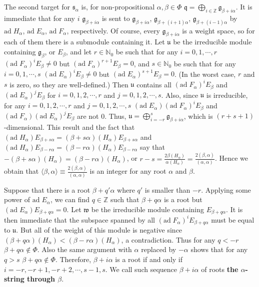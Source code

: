 \documentclass{article}
\newcommand{\NaN}{\mathbb{N}}
\newcommand{\InZ}{\mathbb{Z}}
\newcommand{\lie}[1]{\mathfrak{#1}}
\newcommand{\ad}[1]{\mathrm{ad}\; #1}
\begin{document}
The second target for $\lie{s}_\alpha$ is, for non-propositional $\alpha, \beta \in \Phi$ $\lie{q} = \bigoplus_{i \in \InZ} \lie{g}_{\beta + i\alpha}$.
It is immediate that for any $i$ $\lie{g}_{\beta + i\alpha}$ is sent to $\lie{g}_{\beta + i\alpha}$, $\lie{g}_{\beta + (i + 1)\alpha}$, $\lie{g}_{\beta + (i - 1)\alpha}$ by $\ad{H_\alpha}$, $\ad{E_\alpha}$, $\ad{F_\alpha}$, respectively.
Of course, every $\lie{g}_{\beta + i\alpha}$ is a weight space, so for each of them there is a submodule containing it.
Let $\lie{u}$ be the irreducible module containing $\lie{g}_\beta$, or $E_\beta$, and let $r \in \NaN_0$ be such that for any $i = 0, 1, \cdots, r$ $(\ad{F_\alpha})^i E_\beta \ne 0$ but $(\ad{F_\alpha})^{r + 1} E_\beta = 0$, and $s \in \NaN_0$ be such that for any $i = 0, 1, \cdots, s$ $(\ad{E_\alpha})^i E_\beta \ne 0$ but $(\ad{E_\alpha})^{s + 1} E_\beta = 0$.
(In the worst case, $r$ and $s$ is zero, so they are well-defined.)
Then $\lie{u}$ contains all $(\ad{F_\alpha})^i E_\beta$ and $(\ad{E_\alpha})^j E_\beta$ for $i = 0, 1, 2, \cdots, r$ and $j = 0, 1, 2, \cdots, s$.
Also, since $\lie{u}$ is irreducible, for any $i = 0, 1, 2, \cdots, r$ and $j = 0, 1, 2, \cdots, s$ $(\ad{E_\alpha})(\ad{F_\alpha})^i E_\beta$ and $(\ad{F_\alpha})(\ad{E_\alpha})^j E_\beta$ are not 0.
Thus, $\lie{u} = \bigoplus_{i = -r}^s \lie{g}_{\beta + i\alpha}$, which is $(r + s + 1)$-dimensional.
This result and the fact that $(\ad{H_\alpha})E_{\beta + s\alpha} = (\beta + s\alpha)(H_\alpha) E_{\beta + s\alpha}$ and $(\ad{H_\alpha})E_{\beta - r\alpha} = (\beta - r\alpha)(H_\alpha) E_{\beta - r\alpha}$ say that $-(\beta + s\alpha)(H_\alpha) = (\beta - r\alpha)(H_\alpha)$, or $r - s = \frac{2 \beta(H_\alpha)}{\alpha(H_\alpha)} = \frac{2(\beta, \alpha)}{(\alpha, \alpha)}$.
Hence we obtain that $\langle \beta, \alpha \rangle \equiv \frac{2(\beta, \alpha)}{(\alpha, \alpha)}$ is an integer for any root $\alpha$ and $\beta$.

Suppose that there is a root $\beta + q'\alpha$ where $q'$ is smaller than $-r$.
Applying some power of $\ad{E_\alpha}$, we can find $q \in \InZ$ such that $\beta + q\alpha$ is a root but $(\ad{E_\alpha})E_{\beta + q\alpha} = 0$.
Let $\lie{w}$ be the irreducible module containing $E_{\beta + q\alpha}$.
It is then immediate that the subspace spanned by all $(\ad{F_\alpha})^i E_{\beta + q\alpha}$ must be equal to $\lie{u}$.
But all of the weight of this module is negative since $(\beta + q\alpha)(H_\alpha) < (\beta - r\alpha)(H_\alpha)$, a contradiction.
Thus for any $q < -r$ $\beta + q\alpha \notin \Phi$.
Also the same argument with $\alpha$ replaced by $-\alpha$ shows that for any $q > s$ $\beta + q\alpha \notin \Phi$.
Therefore, $\beta + i\alpha$ is a root if and only if $i = -r, -r + 1, -r + 2, \cdots, s - 1, s$.
We call such sequence $\beta + i\alpha$ of roots \textbf{the $\alpha$-string through $\beta$}.
\end{document}
